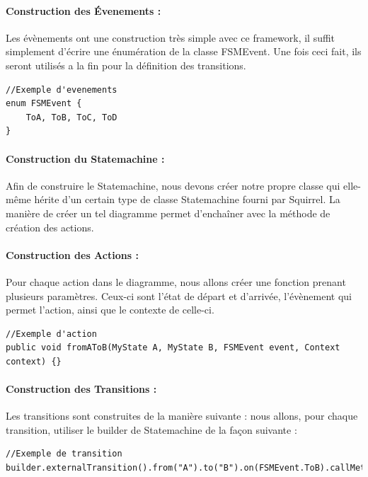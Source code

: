 \documentclass[french, 12pt, a4paper]{article}
\begin{document}
            \paragraph{Construction des Évenements : }
            Les évènements ont une construction très simple avec ce framework, il suffit simplement d'écrire une énumération de la classe FSMEvent. Une fois ceci fait, ils seront utilisés a la fin pour la définition des transitions.
            
            \begin{lstlisting}
//Exemple d'evenements
enum FSMEvent {
    ToA, ToB, ToC, ToD
}
            \end{lstlisting}
            
            \paragraph{Construction du Statemachine : }
            Afin de construire le Statemachine, nous devons créer notre propre classe qui elle-même hérite d'un certain type de classe Statemachine fourni par Squirrel. La manière de créer un tel diagramme permet d'enchaîner avec la méthode de création des actions.
            
            \paragraph{Construction des Actions : }
            Pour chaque action dans le diagramme, nous allons créer une fonction prenant plusieurs paramètres.  Ceux-ci sont l'état de départ et d'arrivée, l'évènement qui permet l'action, ainsi que le contexte de celle-ci.
            
            \begin{lstlisting}
//Exemple d'action
public void fromAToB(MyState A, MyState B, FSMEvent event, Context context) {}
            \end{lstlisting}
            
            \paragraph{Construction des Transitions : }
            Les transitions sont construites de la manière suivante : nous allons, pour chaque transition, utiliser le builder de Statemachine de la façon suivante : 
            
            \begin{lstlisting}
//Exemple de transition
builder.externalTransition().from("A").to("B").on(FSMEvent.ToB).callMethod("fromAToB");
            \end{lstlisting}
            
\end{document}
